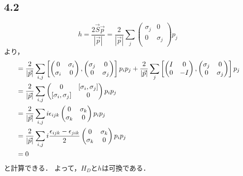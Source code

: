 \subsection*{4.2}
\begin{equation}
  h = \frac{2\vec{S}\vec{p}}{\left|\vec{p}\right|} = \frac{2}{\left|\vec{p}\right|}
  \sum_j
  \begin{pmatrix}
    \sigma_j & 0 \\
    0 & \sigma_j \\
  \end{pmatrix}
  p_j
\end{equation}
より，
\begin{align}
  [H_D, h] &= \frac{2}{\left|\vec{p}\right|} \sum_{i,j} \left[
  \begin{pmatrix}
    0 & \sigma_i \\
    \sigma_i & 0 \\
  \end{pmatrix}
  ,
  \begin{pmatrix}
    \sigma_j & 0 \\
    0 & \sigma_j \\
  \end{pmatrix}
  \right] p_i p_j + \frac{2}{\left|\vec{p}\right|} \sum_j
  \left[
  \begin{pmatrix}
    I & 0 \\
    0 & -I \\
  \end{pmatrix}
  ,
  \begin{pmatrix}
    \sigma_j & 0 \\
    0 & \sigma_j \\    
  \end{pmatrix}
  \right] p_j\notag\\
  &= \frac{2}{\left|\vec{p}\right|} \sum_{i,j}
  \begin{pmatrix}
    0 & [\sigma_i,\sigma_j] \\
    [\sigma_i,\sigma_j] & 0 \\
  \end{pmatrix}
  p_i p_j \notag\\
  &= \frac{2}{\left|\vec{p}\right|} \sum_{i,j} i \epsilon_{ijk}
  \begin{pmatrix}
    0 &  \sigma_k\\
    \sigma_k & 0 \\
  \end{pmatrix}
  p_i p_j \notag\\
  &= \frac{2}{\left|\vec{p}\right|} \sum_{i,j} i \frac{\epsilon_{ijk}-\epsilon_{jik}}{2}
  \begin{pmatrix}
    0 &  \sigma_k\\
    \sigma_k & 0 \\
  \end{pmatrix}
  p_i p_j \notag\\
  &= 0
\end{align}
と計算できる．
よって，$H_D$と$h$は可換である．

